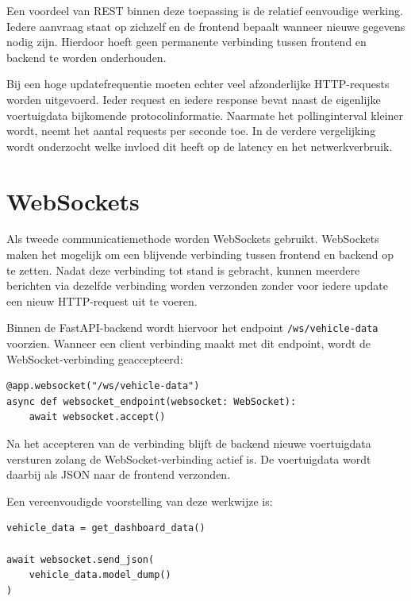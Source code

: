 Een voordeel van REST binnen deze toepassing is de relatief eenvoudige
werking. Iedere aanvraag staat op zichzelf en de frontend bepaalt wanneer
nieuwe gegevens nodig zijn. Hierdoor hoeft geen permanente verbinding tussen
frontend en backend te worden onderhouden.

Bij een hoge updatefrequentie moeten echter veel afzonderlijke HTTP-requests
worden uitgevoerd. Ieder request en iedere response bevat naast de eigenlijke
voertuigdata bijkomende protocolinformatie. Naarmate het pollinginterval
kleiner wordt, neemt het aantal requests per seconde toe. In de verdere
vergelijking wordt onderzocht welke invloed dit heeft op de latency en het
netwerkverbruik.


\section{WebSockets}

Als tweede communicatiemethode worden WebSockets gebruikt. WebSockets maken het
mogelijk om een blijvende verbinding tussen frontend en backend op te zetten.
Nadat deze verbinding tot stand is gebracht, kunnen meerdere berichten via
dezelfde verbinding worden verzonden zonder voor iedere update een nieuw
HTTP-request uit te voeren.

Binnen de FastAPI-backend wordt hiervoor het endpoint
\texttt{/ws/vehicle-data} voorzien. Wanneer een client verbinding maakt met dit
endpoint, wordt de WebSocket-verbinding geaccepteerd:

\begin{verbatim}
@app.websocket("/ws/vehicle-data")
async def websocket_endpoint(websocket: WebSocket):
    await websocket.accept()
\end{verbatim}

Na het accepteren van de verbinding blijft de backend nieuwe voertuigdata
versturen zolang de WebSocket-verbinding actief is. De voertuigdata wordt
daarbij als JSON naar de frontend verzonden.

Een vereenvoudigde voorstelling van deze werkwijze is:

\begin{listing}[H]
\begin{verbatim}
vehicle_data = get_dashboard_data()

await websocket.send_json(
    vehicle_data.model_dump()
)
\end{verbatim}
\caption{Versturen van voertuigdata via WebSockets}
\label{lst:websocket-vehicle-data}
\end{listing}

